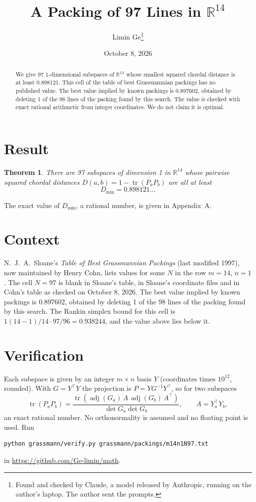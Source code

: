 \documentclass[11pt,a4paper]{article}
\title{A Packing of 97 Lines in $\mathbb{R}^{14}$}
\author{Limin Ge\thanks{Found and checked by Claude, a model released by Anthropic, running on the author's laptop. The author sent the prompts.}}
\date{October 8, 2026}
\newtheorem*{theorem}{Theorem}
\begin{document}
\maketitle
\begin{abstract}
We give 97 1-dimensional subspaces of $\mathbb{R}^{14}$ whose smallest squared chordal distance is at least 0.898121. This cell of the table of best Grassmannian packings has no published value. The best value implied by known packings is 0.897602, obtained by deleting 1 of the 98 lines of the packing found by this search. The value is checked with exact rational arithmetic from integer coordinates. We do not claim it is optimal.
\end{abstract}

\section{Result}
\begin{theorem}
There are 97 subspaces of dimension 1 in $\mathbb{R}^{14}$ whose pairwise squared chordal distances $D(a,b) = 1 - \operatorname{tr}(P_aP_b)$ are all at least
\[ D_{\min} = 0.898121\ldots \]
\end{theorem}
The exact value of $D_{\min}$, a rational number, is given in Appendix~A.


\section{Context}
N.~J.~A.~Sloane's \emph{Table of Best Grassmannian Packings} (last modified 1997), now maintained by Henry Cohn, lists values for some $N$ in the row $m=14$, $n=1$. The cell $N=97$ is blank in Sloane's table, in Sloane's coordinate files and in Cohn's table as checked on October 8, 2026. The best value implied by known packings is 0.897602, obtained by deleting 1 of the 98 lines of the packing found by this search. The Rankin simplex bound for this cell is $1(14-1)/14\cdot 97/96 = 0.938244$, and the value above lies below it.


\section{Verification}
Each subspace is given by an integer $m\times n$ basis $Y$ (coordinates times $10^{12}$, rounded). With $G=Y^\top Y$ the projection is $P=YG^{-1}Y^\top$, so for two subspaces
\[ \operatorname{tr}(P_aP_b)=\frac{\operatorname{tr}(\operatorname{adj}(G_a)\,A\,\operatorname{adj}(G_b)\,A^\top)}{\det G_a\det G_b},\qquad A=Y_a^\top Y_b, \]
an exact rational number. No orthonormality is assumed and no floating point is used. Run
\begin{verbatim}
python grassmann/verify.py grassmann/packings/m14n1N97.txt
\end{verbatim}
in \url{https://github.com/Ge-limin/math}.
\end{document}
